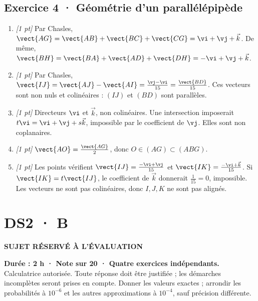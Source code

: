 \subsection*{Exercice 4 · Géométrie d'un parallélépipède}\begin{enumerate}

\item \textit{[1 pt]} Par Chasles, $\vect{AG}=\vect{AB}+\vect{BC}+\vect{CG}=\vi +\vj +\vec k$. De même, $\vect{BH}=\vect{BA}+\vect{AD}+\vect{DH}=-\vi +\vj +\vec k$.

\item \textit{[1 pt]} Par Chasles, $\vect{IJ}=\vect{AJ}-\vect{AI}=\frac{\vj -\vi }{15}=\frac{\vect{BD}}{15}$. Ces vecteurs sont non nuls et colinéaires : $(IJ)$ et $(BD)$ sont parallèles.

\item \textit{[1 pt]} Directeurs $\vi $ et $\vec k$, non colinéaires. Une intersection imposerait $t\vi =\vi +\vj +s\vec k$, impossible par le coefficient de $\vj $. Elles sont non coplanaires.

\item \textit{[1 pt]} $\vect{AO}=\frac{\vect{AG}}{2}$, donc $O\in(AG)\subset(ABG)$.

\item \textit{[1 pt]} Les points vérifient $\vect{IJ}=\frac{-\vi +\vj }{15}$ et $\vect{IK}=\frac{-\vi +\vec k}{15}$. Si $\vect{IK}=t\vect{IJ}$, le coefficient de $\vec k$ donnerait $\frac{1}{15}=0$, impossible. Les vecteurs ne sont pas colinéaires, donc $I,J,K$ ne sont pas alignés.

\end{enumerate}

\fi

\fi

\ifprof

\clearpage{}\label{sujet:2-4}

\section*{DS2 · B}

{\sffamily\bfseries\color{amber}SUJET RÉSERVÉ À L'ÉVALUATION\par}

\textbf{Durée : 2 h · Note sur 20 · Quatre exercices indépendants.}\\Calculatrice autorisée. Toute réponse doit être justifiée ; les démarches incomplètes seront prises en compte. Donner les valeurs exactes ; arrondir les probabilités à $10^{-6}$ et les autres approximations à $10^{-4}$, sauf précision différente.

